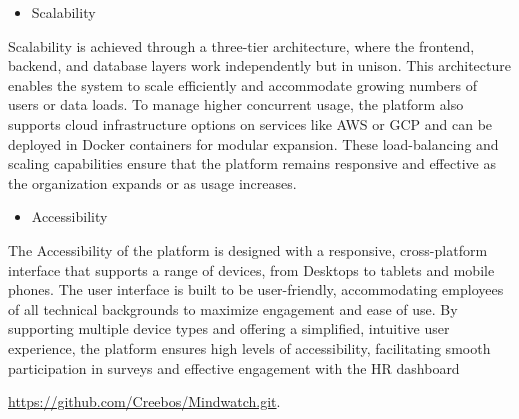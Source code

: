 \documentclass[conference]{IEEEtran}
\begin{document}
    \begin{itemize}
        \item Scalability
        \end{itemize}
    
    Scalability is achieved through a three-tier architecture, where the 
    frontend, backend, and database layers work independently but in 
    unison. This architecture enables the system to scale efficiently 
    and accommodate growing numbers of users or data loads. To manage 
    higher concurrent usage, the platform also supports cloud 
    infrastructure options on services like AWS or GCP and can be 
    deployed in Docker containers for modular expansion. These 
    load-balancing and scaling capabilities ensure that the platform 
    remains responsive and effective as the organization expands or as 
    usage increases.
    \newline    

    \begin{itemize}
        \item Accessibility
        \end{itemize}

    The Accessibility of the platform is designed with a responsive, 
    cross-platform interface that supports a range of devices, from 
    Desktops to tablets and mobile phones. The user interface is built 
    to be user-friendly, accommodating employees of all technical 
    backgrounds to maximize engagement and ease of use. By supporting 
    multiple device types and offering a simplified, intuitive user 
    experience, the platform ensures high levels of accessibility, 
    facilitating smooth participation in surveys and effective 
    engagement with the HR dashboard
    \newline  \newline  \newline  
    
    \href{https://github.com/Creebos/Mindwatch.git}{https://github.com/Creebos/Mindwatch.git}.
\end{document}
